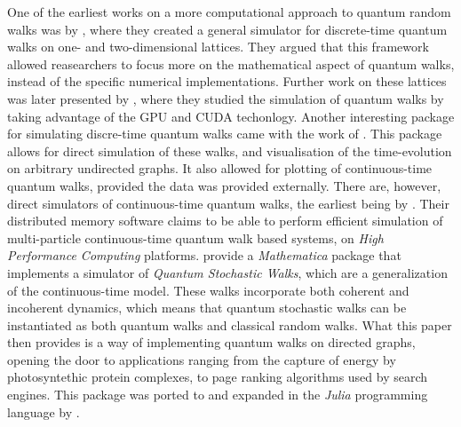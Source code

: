 \documentclass[../../dissertation.tex]{subfiles}
\begin{document}
One of the earliest works on a more computational approach to quantum random
walks was by \cite{marquezino2008}, where they created a general simulator for
discrete-time quantum walks on one- and two-dimensional lattices. They argued
that this framework allowed reasearchers to focus more on the mathematical
aspect of quantum walks, instead of the specific numerical implementations.
Further work on these lattices was later presented by \cite{sawerwain2010},
where they studied the simulation of quantum walks by taking advantage of the
GPU and CUDA techonlogy. Another interesting package for simulating discre-time
quantum walks came with the work of \cite{berry2011}. This package allows for
direct simulation of these walks, and visualisation of the time-evolution on
arbitrary undirected graphs. It also allowed for plotting of continuous-time
quantum walks, provided the data was provided externally. 
There are, however, direct simulators of continuous-time quantum walks, the
earliest being by \cite{izaac2015}. Their distributed memory software claims to
be able to perform efficient simulation of multi-particle continuous-time
quantum walk based systems, on \textit{High Performance Computing} platforms.
\cite{falloon2017a} provide a \textit{Mathematica} package that implements a
simulator of \textit{Quantum Stochastic Walks}, which are a generalization of
the continuous-time model. These walks incorporate both coherent and incoherent
dynamics, which means that quantum stochastic walks can be instantiated as both
quantum walks and classical random walks. What this paper then provides is a
way of implementing quantum walks on directed graphs, opening the door to
applications ranging from the capture of energy by photosyntethic protein
complexes, to page ranking algorithms used by search engines. This package was
ported to and expanded in the \textit{Julia} programming language by
\cite{glos2018}.
\end{document}
